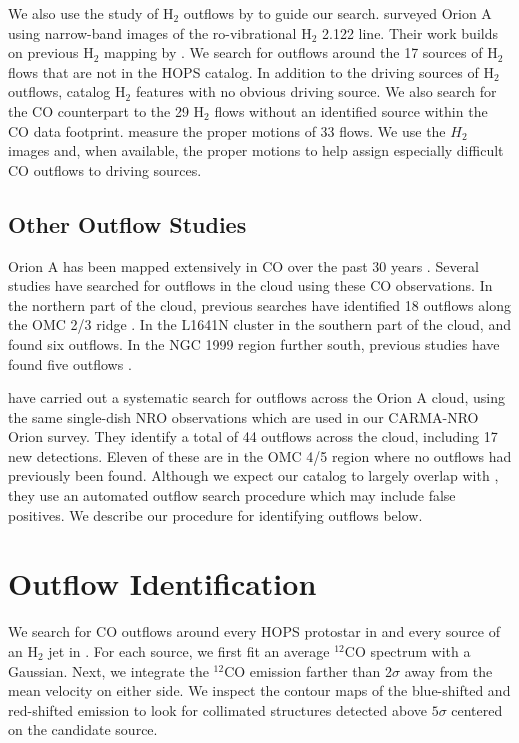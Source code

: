 \documentclass[twocolumn]{aastex63}
\newcommand{\co}[1][]{\ensuremath{^{#1}}CO}
\begin{document}
We also use the study of H$_2$ outflows by \citet{Davis09} to guide our search. \citet{Davis09} surveyed Orion A using narrow-band images of the ro-vibrational H$_2$ 2.122 \micron{} line. Their work builds on previous H$_2$ mapping by \citet{Stanke02}. We search for outflows around the 17 sources of H$_2$ flows that are not in the HOPS catalog. In addition to the driving sources of H$_2$ outflows, \citet{Davis09} catalog H$_2$ features with no obvious driving source. We also search for the CO counterpart to the 29 H$_2$ flows without an identified source within the CO data footprint. \citet{Davis09} measure the proper motions of 33 flows. We use the $H_2$ images and, when available, the proper motions to help assign especially difficult CO outflows to driving sources.

\subsection{Other Outflow Studies}
Orion A has been mapped extensively in CO over the past 30 years \citep[e.g.][]{Bally87,Wilson05,Shimajiri11,Buckle12,Ripple13,Berne14}. Several studies have searched for outflows in the cloud using these CO observations. In the northern part of the cloud, previous searches have identified 18 outflows along the OMC 2/3 ridge \citep{Chini97,Aso00,Williams03,Takahashi08,Shimajiri08,Shimajiri09}. In the L1641N cluster in the southern part of the cloud, \citet{Stanke07} and \citet{Nakamura12} found six outflows. In the NGC 1999 region further south, previous studies have found five outflows \citep{Morgan91,Moro-Martin99,Davis2000,Choi17}. 

\citet{Tanabe:submitted} have carried out a systematic search for outflows across the Orion A cloud, using the same single-dish NRO observations which are used in our CARMA-NRO Orion survey. They identify a total of 44 outflows across the cloud, including 17 new detections. Eleven of these are in the OMC 4/5 region where no outflows had previously been found. Although we expect our catalog to largely overlap with \citet{Tanabe:submitted}, they use an automated outflow search procedure which may include false positives. We describe our procedure for identifying outflows below.

\section{Outflow Identification}
\label{sec:identification}
We search for CO outflows around every HOPS protostar in \citet{Furlan16} and every source of an H$_2$ jet in \citet{Davis09}. For each source, we first fit an average \co[12] spectrum with a Gaussian. Next, we integrate the \co[12] emission farther than 2$\sigma$ away from the mean velocity on either side. We inspect the contour maps of the blue-shifted and red-shifted emission to look for collimated structures detected above $5\sigma$ centered on the candidate source.
\end{document}
